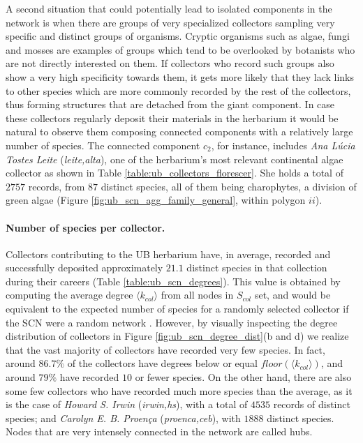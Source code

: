 A second situation that could potentially lead to isolated components in the network is when there are groups of very specialized collectors sampling very specific and distinct groups of organisms. 
Cryptic organisms such as algae, fungi and mosses are examples of groups which tend to be overlooked by botanists who are not directly interested on them. 
If collectors who record such groups also show a very high specificity towards them, it gets more likely that they lack links to other species which are more commonly recorded by the rest of the collectors, thus forming structures that are detached from the giant component. 
In case these collectors regularly deposit their materials in the herbarium it would be natural to observe them composing connected components with a relatively large number of species.
The connected component $c_2$, for instance, includes \textit{Ana Lúcia Tostes Leite} (\textit{leite,alta}), one of the herbarium's most relevant continental algae collector as shown in Table \ref{table:ub_collectors_florescer}.
She holds a total of $2757$ records, from $87$ distinct species, all of them being charophytes, a division of green algae (Figure \ref{fig:ub_scn_agg_family_general}, within polygon $ii$).



\paragraph*{Number of species per collector.}
Collectors contributing to the UB herbarium have, in average, recorded and successfully deposited approximately $21.1$ distinct species in that collection during their careers (Table \ref{table:ub_scn_degrees}). This value is obtained by computing the average degree $\langle k_{col} \rangle$ from all nodes in $S_{col}$ set, and would be equivalent to the expected number of species for a randomly selected collector if the SCN were a random network \cite{Albert2002}.
However, by visually inspecting the degree distribution of collectors in Figure \ref{fig:ub_scn_degree_dist}(b and d) we realize that the vast majority of collectors have recorded very few species. In fact, around $86.7\%$ of the collectors have degrees below or equal $floor(\langle k_{col} \rangle)$, and around $79\%$ have recorded $10$ or fewer species.
On the other hand, there are also some few collectors who have recorded much more species than the average, as it is the case of \textit{Howard S. Irwin} (\textit{irwin,hs}), with a total of $4535$ records of distinct species; and \textit{Carolyn E. B. Proença} (\textit{proenca,ceb}), with $1888$ distinct species. Nodes that are very intensely connected in the network are called hubs.

